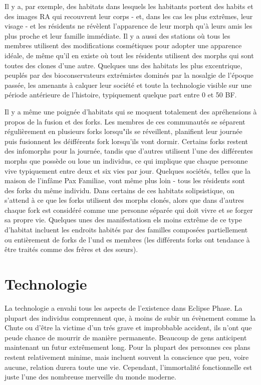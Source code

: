       Il y a, par exemple, des habitats dans lesquels les habitants portent des habits et des images RA qui recouvrent leur corps - et, dans les cas les plus extrêmes, leur visage - et les résidents ne révèlent l'apparence de leur morph qu'à leurs amis les plus proche et leur famille immédiate. Il y a aussi des stations où tous les membres utilisent des modifications cosmétiques pour adopter une apparence idéale, de même qu'il en existe où tout les résidents utilisent des morphs qui sont toutes des clones d'une autre. Quelques uns des habitats les plus excentrique, peuplés par des bioconservateurs extrémistes dominés par la nosalgie de l'époque passée, les amenants à calquer leur société et toute la technologie visible sur une période antérieure de l'histoire, typiquement quelque part entre 0 et 50 BF. 

      Il y a même une poignée d'habitats qui se moquent totalement des apréhensions à propos de la fusion et des forks. Les membres de ces communautés se séparent régulièrement en plusieurs forks lorsqu"ils se réveillent, planifient leur journée puis fusionnent les déifférents fork lorsqu'ils vont dormir. Certains forks restent des infomorphs pour la journée, tandis que d'autres utilisent l'une des différentes morphs que possède ou loue un individus, ce qui implique que chaque personne vive typiquement entre deux et six vies par jour. Quelques sociétés, telles que la maison de l'infâme Pax Familiae, vont même plus loin - tous les résidents sont des forks du même individu. Dans certains de ces habitats solipsistique, on s'attend à ce que les forks utilisent des morphs clonés, alors que dans d'autres chaque fork est considéré comme une personne séparée qui doit vivre et se forger sa propre vie. Quelques unes des manifestatiosn els moins extrême de ce type d'habitat incluent les endroits habités par des familles composées partiellement ou entièrement de forks de l'und es membres (les différents forks ont tendance à être traités comme des frêres et des sœurs). 

      \section{Technologie} \label{sec:technology} 

      La technologie a envahi tous les aspects de l'existence dans Eclipse Phase. La plupart des individus comprennent que, à moins de subir un évènement comme la Chute ou d'être la victime d'un trés grave et improbbable accident, ils n'ont que peude chance de mourrir de manière permanente. Beaucoup de gens anticipent maintenant un futur extrêmement long. Pour la plupart des personnes ces plans restent relativement minime, mais incluent souvent la conscience que peu, voire aucune, relation durera toute une vie. Cependant, l'immortalité fonctionnelle est juste l'une des nombreuse merveille du monde moderne. 

